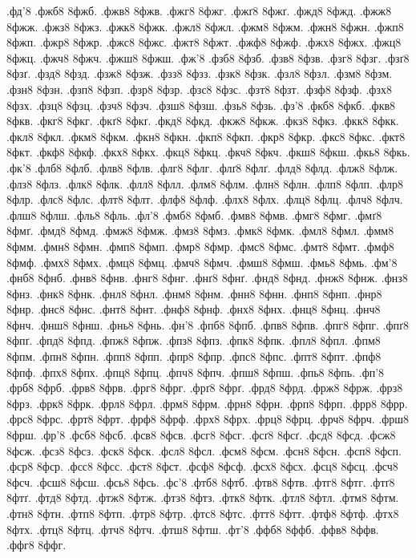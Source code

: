 {%
.фд'8
.фжб8 8фжб.
.фжв8 8фжв.
.фжг8 8фжг.
.фжґ8 8фжґ.
.фжд8 8фжд.
.фжж8 8фжж.
.фжз8 8фжз.
.фжк8 8фжк.
.фжл8 8фжл.
.фжм8 8фжм.
.фжн8 8фжн.
.фжп8 8фжп.
.фжр8 8фжр.
.фжс8 8фжс.
.фжт8 8фжт.
.фжф8 8фжф.
.фжх8 8фжх.
.фжц8 8фжц.
.фжч8 8фжч.
.фжш8 8фжш.
.фж'8
.фзб8 8фзб.
.фзв8 8фзв.
.фзг8 8фзг.
.фзґ8 8фзґ.
.фзд8 8фзд.
.фзж8 8фзж.
.фзз8 8фзз.
.фзк8 8фзк.
.фзл8 8фзл.
.фзм8 8фзм.
.фзн8 8фзн.
.фзп8 8фзп.
.фзр8 8фзр.
.фзс8 8фзс.
.фзт8 8фзт.
.фзф8 8фзф.
.фзх8 8фзх.
.фзц8 8фзц.
.фзч8 8фзч.
.фзш8 8фзш.
.фзь8 8фзь.
.фз'8
.фкб8 8фкб.
.фкв8 8фкв.
.фкг8 8фкг.
.фкґ8 8фкґ.
.фкд8 8фкд.
.фкж8 8фкж.
.фкз8 8фкз.
.фкк8 8фкк.
.фкл8 8фкл.
.фкм8 8фкм.
.фкн8 8фкн.
.фкп8 8фкп.
.фкр8 8фкр.
.фкс8 8фкс.
.фкт8 8фкт.
.фкф8 8фкф.
.фкх8 8фкх.
.фкц8 8фкц.
.фкч8 8фкч.
.фкш8 8фкш.
.фкь8 8фкь.
.фк'8
.флб8 8флб.
.флв8 8флв.
.флг8 8флг.
.флґ8 8флґ.
.флд8 8флд.
.флж8 8флж.
.флз8 8флз.
.флк8 8флк.
.флл8 8флл.
.флм8 8флм.
.флн8 8флн.
.флп8 8флп.
.флр8 8флр.
.флс8 8флс.
.флт8 8флт.
.флф8 8флф.
.флх8 8флх.
.флц8 8флц.
.флч8 8флч.
.флш8 8флш.
.фль8 8фль.
.фл'8
.фмб8 8фмб.
.фмв8 8фмв.
.фмг8 8фмг.
.фмґ8 8фмґ.
.фмд8 8фмд.
.фмж8 8фмж.
.фмз8 8фмз.
.фмк8 8фмк.
.фмл8 8фмл.
.фмм8 8фмм.
.фмн8 8фмн.
.фмп8 8фмп.
.фмр8 8фмр.
.фмс8 8фмс.
.фмт8 8фмт.
.фмф8 8фмф.
.фмх8 8фмх.
.фмц8 8фмц.
.фмч8 8фмч.
.фмш8 8фмш.
.фмь8 8фмь.
.фм'8
.фнб8 8фнб.
.фнв8 8фнв.
.фнг8 8фнг.
.фнґ8 8фнґ.
.фнд8 8фнд.
.фнж8 8фнж.
.фнз8 8фнз.
.фнк8 8фнк.
.фнл8 8фнл.
.фнм8 8фнм.
.фнн8 8фнн.
.фнп8 8фнп.
.фнр8 8фнр.
.фнс8 8фнс.
.фнт8 8фнт.
.фнф8 8фнф.
.фнх8 8фнх.
.фнц8 8фнц.
.фнч8 8фнч.
.фнш8 8фнш.
.фнь8 8фнь.
.фн'8
.фпб8 8фпб.
.фпв8 8фпв.
.фпг8 8фпг.
.фпґ8 8фпґ.
.фпд8 8фпд.
.фпж8 8фпж.
.фпз8 8фпз.
.фпк8 8фпк.
.фпл8 8фпл.
.фпм8 8фпм.
.фпн8 8фпн.
.фпп8 8фпп.
.фпр8 8фпр.
.фпс8 8фпс.
.фпт8 8фпт.
.фпф8 8фпф.
.фпх8 8фпх.
.фпц8 8фпц.
.фпч8 8фпч.
.фпш8 8фпш.
.фпь8 8фпь.
.фп'8
.фрб8 8фрб.
.фрв8 8фрв.
.фрг8 8фрг.
.фрґ8 8фрґ.
.фрд8 8фрд.
.фрж8 8фрж.
.фрз8 8фрз.
.фрк8 8фрк.
.фрл8 8фрл.
.фрм8 8фрм.
.фрн8 8фрн.
.фрп8 8фрп.
.фрр8 8фрр.
.фрс8 8фрс.
.фрт8 8фрт.
.фрф8 8фрф.
.фрх8 8фрх.
.фрц8 8фрц.
.фрч8 8фрч.
.фрш8 8фрш.
.фр'8
.фсб8 8фсб.
.фсв8 8фсв.
.фсг8 8фсг.
.фсґ8 8фсґ.
.фсд8 8фсд.
.фсж8 8фсж.
.фсз8 8фсз.
.фск8 8фск.
.фсл8 8фсл.
.фсм8 8фсм.
.фсн8 8фсн.
.фсп8 8фсп.
.фср8 8фср.
.фсс8 8фсс.
.фст8 8фст.
.фсф8 8фсф.
.фсх8 8фсх.
.фсц8 8фсц.
.фсч8 8фсч.
.фсш8 8фсш.
.фсь8 8фсь.
.фс'8
.фтб8 8фтб.
.фтв8 8фтв.
.фтг8 8фтг.
.фтґ8 8фтґ.
.фтд8 8фтд.
.фтж8 8фтж.
.фтз8 8фтз.
.фтк8 8фтк.
.фтл8 8фтл.
.фтм8 8фтм.
.фтн8 8фтн.
.фтп8 8фтп.
.фтр8 8фтр.
.фтс8 8фтс.
.фтт8 8фтт.
.фтф8 8фтф.
.фтх8 8фтх.
.фтц8 8фтц.
.фтч8 8фтч.
.фтш8 8фтш.
.фт'8
.ффб8 8ффб.
.ффв8 8ффв.
.ффг8 8ффг.
}
